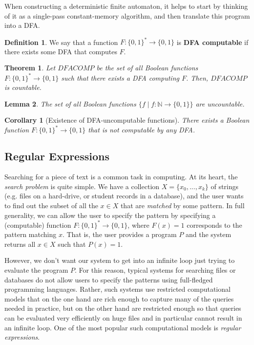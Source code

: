 \documentclass[a4paper, 12pt]{report}
\newtheorem{theorem}{Theorem}[section]
\newtheorem{corollary}{Corollary}[theorem]
\newtheorem{lemma}[theorem]{Lemma}
\theoremstyle{remark}
\theoremstyle{definition}
\newtheorem{definition}{Definition}[section]
\begin{document}
When constructing a deterministic finite automaton, it helps to start by thinking of it as a single-pass constant-memory algorithm, and then translate this program into a DFA. 

\begin{definition}
We say that a function $F: \{0,1\}^* \longrightarrow \{0,1\}$ is \textbf{DFA computable} if there exists some DFA that computes $F$. 
\end{definition}

\begin{theorem}
Let $DFACOMP$ be the set of all Boolean functions $F: \{0,1\}^* \longrightarrow \{0,1\}$ such that there exists a DFA computing $F$. Then, $DFACOMP$ is countable. 
\end{theorem}

\begin{lemma}
The set of all Boolean functions $\{f\;|\; f: \mathbb{N} \longrightarrow \{0,1\}\}$ are uncountable. 
\end{lemma}

\begin{corollary}[Existence of DFA-uncomputable functions]
There exists a Boolean function $F: \{0,1\}^* \longrightarrow \{0,1\}$ that is not computable by \textit{any} DFA. 
\end{corollary}

\subsection{Regular Expressions}
Searching for a piece of text is a common task in computing. At its heart, the \textit{search problem} is quite simple. We have a collection $X = \{x_0, ..., x_k\}$ of strings (e.g. files on a hard-drive, or student records in a database), and the user wants to find out the subset of all the $x \in X$ that are \textit{matched} by some pattern. In full generality, we can allow the user to specify the pattern by specifying a (computable) function $F: \{0,1\}^* \longrightarrow \{0,1\}$, where $F(x) = 1$ corresponds to the pattern matching $x$. That is, the user provides a program $P$ and the system returns all $x \in X$ such that $P(x) = 1$. 

However, we don’t want our system to get into an infinite loop just trying to evaluate the program $P$. For this reason, typical systems for searching files or databases do not allow users to specify the patterns using full-fledged programming languages. Rather, such systems use restricted computational models that on the one hand are rich enough to capture many of the queries needed in practice, but on the other hand are restricted enough so that queries can be evaluated very efficiently on huge files and in particular cannot result in an infinite loop. One of the most popular such computational models is \textit{regular expressions}. 
\end{document}
